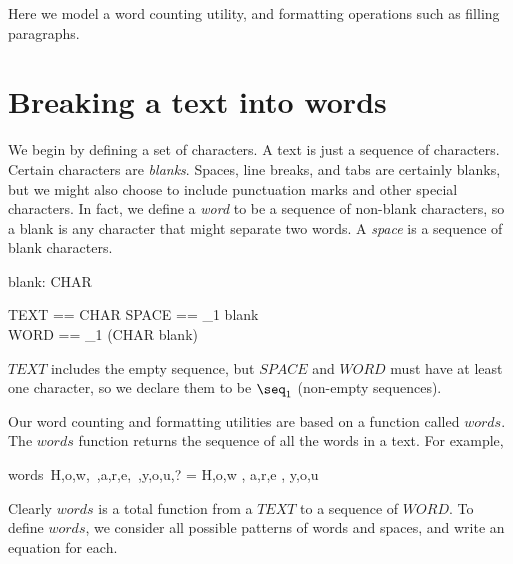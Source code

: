 \documentclass{article}
\begin{document}
Here we model a word counting utility, and formatting operations such
as filling paragraphs.

\section{Breaking a text into words}

We begin by defining a set of characters.  A text is just a
sequence of characters.  Certain characters are {\em blanks}.  Spaces, line
breaks, and tabs are certainly blanks, but we might also choose to include
punctuation marks and other special characters.  In fact, we define a 
{\em word} to be a sequence of non-blank characters, 
so a blank is any character
that might separate two words.  A {\em space} is a sequence of blank
characters.  

\begin{zed} [CHAR] \end{zed}
\begin{axdef} blank: \power CHAR \end{axdef}
\begin{zed}
        TEXT == \seq CHAR
\also
	SPACE == \seq_1 blank \\
\also
	WORD == \seq_1 (CHAR \setminus blank)
\end{zed}
$TEXT$ includes the empty sequence, but $SPACE$ and $WORD$ must have
at least one character, so we declare them to be $\seq_1$ (non-empty
sequences).

Our word counting and formatting utilities are based on a function called
$words$.  The $words$ function returns the sequence of all the words in a
text.  For example,

\begin{zed}
words~\langle H,o,w,~,a,r,e,~,y,o,u,? \rangle = \langle \langle H,o,w \rangle , \langle a,r,e \rangle , \langle y,o,u \rangle \rangle
\end{zed}
Clearly $words$ is a total function from a $TEXT$ to a sequence of $WORD$.
To define $words$, we consider all possible patterns of words and spaces, and
write an equation for each. 
\end{document}
